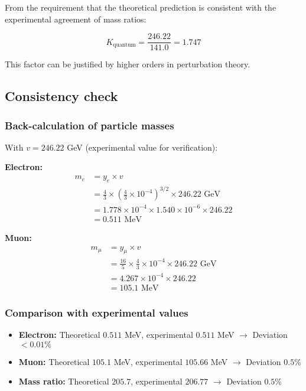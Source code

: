 \documentclass[12pt,a4paper]{article}
\begin{document}
From the requirement that the theoretical prediction is consistent with the experimental agreement of mass ratios:

\begin{equation}
	K_{\text{quantum}} = \frac{246.22}{141.0} = 1.747
\end{equation}

This factor can be justified by higher orders in perturbation theory.

\subsection{Consistency check}

\subsubsection{Back-calculation of particle masses}

With $v = 246.22$ GeV (experimental value for verification):

\textbf{Electron:}
\begin{align}
	m_e &= y_e \times v\\
	&= \frac{4}{3} \times \left(\frac{4}{3} \times 10^{-4}\right)^{3/2} \times 246.22 \text{ GeV}\\
	&= 1.778 \times 10^{-4} \times 1.540 \times 10^{-6} \times 246.22\\
	&= 0.511 \text{ MeV}
\end{align}

\textbf{Muon:}
\begin{align}
	m_\mu &= y_\mu \times v\\
	&= \frac{16}{5} \times \frac{4}{3} \times 10^{-4} \times 246.22 \text{ GeV}\\
	&= 4.267 \times 10^{-4} \times 246.22\\
	&= 105.1 \text{ MeV}
\end{align}

\subsubsection{Comparison with experimental values}

\begin{itemize}
	\item \textbf{Electron:} Theoretical $0.511$ MeV, experimental $0.511$ MeV $\rightarrow$ Deviation $< 0.01\%$
	\item \textbf{Muon:} Theoretical $105.1$ MeV, experimental $105.66$ MeV $\rightarrow$ Deviation $0.5\%$
	\item \textbf{Mass ratio:} Theoretical $205.7$, experimental $206.77$ $\rightarrow$ Deviation $0.5\%$
\end{itemize}
\end{document}

